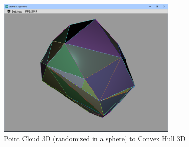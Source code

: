 \documentclass[12pt,a4paper,english]{article}
\begin{document}
\begin{figure}[H]
    \centering
    \includegraphics[width=0.8\textwidth]{p4-2-b}
    \caption[]{Point Cloud 3D (randomized in a sphere) to Convex Hull 3D}
    \label{fig:p4-2-b}
\end{figure}
\end{document}
